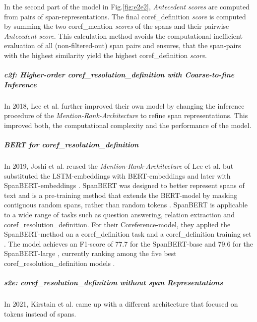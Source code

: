In the second part of the model in Fig.\ref{fig:e2e2}, \emph{Antecedent scores} are computed from pairs of \gls{span}-representations.
The final \gls{coref_definition} \emph{score} is computed by summing the two \gls{coref_mention} \emph{scores} of the \glspl{span} and their pairwise \emph{Antecedent score}.
This calculation method avoids the computational inefficient evaluation of all (non-filtered-out) \gls{span} pairs and ensures, that the \gls{span}-pairs with the highest similarity yield the highest \gls{coref_definition} \emph{score}.

\subparagraph{c2f: Higher-order \gls{coref_resolution_definition} with Coarse-to-fine Inference}
In 2018, Lee et al. further improved their own model by changing the inference procedure of the \emph{Mention-Rank-Architecture}\cite{CorefCoarseFine} to refine \gls{span} representations.
This improved both, the computational complexity and the performance of the model.

\subparagraph{BERT for \gls{coref_resolution_definition}}
In 2019, Joshi et al. \cite{CorefWithBert} reused the \emph{Mention-Rank-Architecture} of Lee et al.\cite{CorefEndToEnd} but substituted the LSTM-embeddings with \gls{BERT}-embeddings \cite{BERT} and later with \gls{SpanBERT}-embeddings \cite{SpanBERT}.
\gls{SpanBERT} was designed to better represent \glspl{span} of text and is a pre-training method that extends the \gls{BERT}-model by masking contiguous random \glspl{span}, rather than random \glspl{token} \cite{SpanBERT}.
\gls{SpanBERT} is applicable to a wide range of tasks such as question answering, relation extraction and \gls{coref_resolution_definition}.
For their Coreference-model, they applied the \gls{SpanBERT}-method on a \gls{coref_definition} task and a \gls{coref_definition} training set \cite{SpanBERT}.
The model achieves an F1-score of 77.7 for the \gls{SpanBERT}-base and 79.6 for the \gls{SpanBERT}-large \cite{CorefWithBert}, currently ranking among the five best \gls{coref_resolution_definition} models \cite{CorefEvaluation}.

\subparagraph{s2e: \gls{coref_resolution_definition} without \gls{span} Representations}
In 2021, Kirstain et al.\cite{KirstainCoref} came up with a different architecture that focused on \glspl{token} instead of \glspl{span}.

